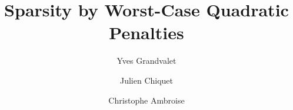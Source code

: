 \documentclass[preprint,12pt,authoryear]{elsarticle}
\begin{document}
\begin{frontmatter}






\title{Sparsity by Worst-Case Quadratic Penalties}


\author{Yves Grandvalet}
\address{Sorbonne universit\'es, Universit\'e de technologie de Compi\`egne, 
CNRS, \\ Heudiasyc UMR 7253, CS 60 319, 60 203 Compi\`egne cedex, France}
\author{Julien Chiquet}
\author{Christophe Ambroise}
\address{ Laboratoire de Math\'ematiques et Mod\`elisation d'\'Evry val d'Essonne\\
        CNRS UMR 8071 \& Universit\'e d'\'Evry
        23, Boulevard de France\\
       91000 \'Evry, FRANCE}




\end{frontmatter}
\end{document}
